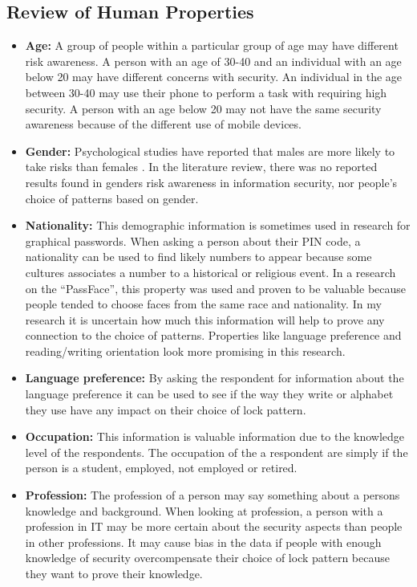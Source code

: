     \subsection{Review of Human Properties} \label{sec:datarequirements}

    \begin{itemize}
      \item {\bf Age:} A group of people within a particular group of age may have different risk awareness. A person with an age of 30-40 and an individual with an age below 20 may have different concerns with security. An individual in the age between 30-40 may use their phone to perform a task with requiring high security. A person with an age below 20 may not have the same security awareness because of the different use of mobile devices.
      \item {\bf Gender:} Psychological studies have reported that males are more likely to take risks than females \cite{Byrnes}. In the literature review, there was no reported results found in genders risk awareness in information security, nor people's choice of patterns based on gender.  
      \item {\bf Nationality:} This demographic information is sometimes used in research for graphical passwords. When asking a person about their PIN code, a nationality can be used to find likely numbers to appear because some cultures associates a number to a historical or religious event. In a research on the ``PassFace'', this property was used and proven to be valuable because people tended to choose faces from the same race and nationality. In my research it is uncertain how much this information will help to prove any connection to the choice of patterns. Properties like language preference and reading/writing orientation look more promising in this research.
      \item {\bf Language preference:} By asking the respondent for information about the language preference it can be used to see if the way they write or alphabet they use have any impact on their choice of lock pattern.
      \item{\bf Occupation:} This information is valuable information due to the knowledge level of the respondents. The occupation of the a respondent are simply if the person is a student, employed, not employed or retired.
      \item {\bf Profession:} The profession of a person may say something about a persons knowledge and background. When looking at profession, a person with a profession in IT may be more certain about the security aspects than people in other professions. It may cause bias in the data if people with enough knowledge of security overcompensate their choice of lock pattern because they want to prove their knowledge.  

\end{itemize}
